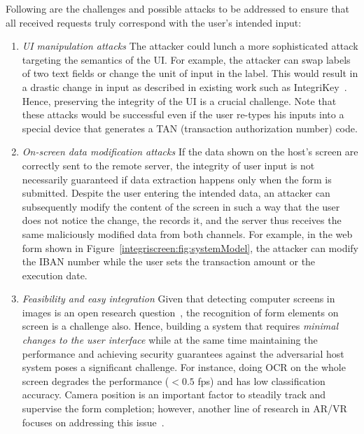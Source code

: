 Following are the challenges and possible attacks to be addressed to ensure that all received requests truly correspond with the user's intended input:

\begin{enumerate}

\item \emph{UI manipulation attacks}
The attacker could lunch a more sophisticated attack targeting the semantics of the UI. For example, the attacker can swap labels of two text fields or change the unit of input in the label. This would result in a drastic change in input as described in existing work such as IntegriKey~\cite{integrikey}. Hence, preserving the integrity of the UI is a crucial challenge. Note that these attacks would be successful even if the user re-types his inputs into a special device that generates a TAN (transaction authorization number) code.


\item \emph{On-screen data modification attacks} If the data shown on the host's screen are correctly sent to the remote server, the integrity of user input is not necessarily guaranteed if data extraction happens only when the form is submitted.
Despite the user entering the intended data, an attacker can subsequently modify the content of the screen in such a way that the user does not notice the change, the \app records it, and the server thus receives the same maliciously modified data from both channels. For example, in the web form shown in Figure~\ref{integriscreen:fig:systemModel}, the attacker can modify the IBAN number while the user sets the transaction amount or the execution date. 

 

\item \emph{Feasibility and easy integration}
Given that detecting computer screens in images is an open research question~\cite{detectingScreens}, the recognition of form elements on screen is a challenge also. Hence, building a system that requires \emph{minimal changes to the user interface} while at the same time maintaining the performance and achieving security guarantees against the adversarial host system poses a significant challenge. For instance, doing OCR on the whole screen degrades the performance ($<0.5$ fps) and has low classification accuracy. Camera position is an important factor to steadily track and supervise the form completion; however, another line of research in AR/VR focuses on addressing this issue~\cite{objectDetectionMobicom19, objectDetectionNIPS15, objectDetectionBD18}.

\end{enumerate}

